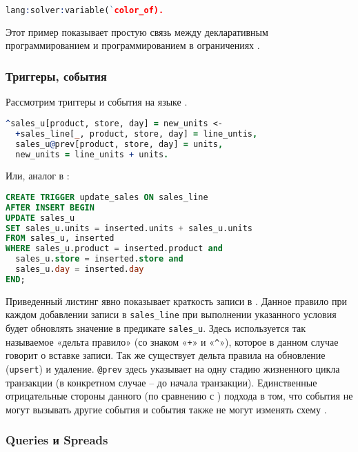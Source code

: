 \begin{lstlisting}[language=Prolog]
lang:solver:variable(`color_of).
\end{lstlisting}

Этот пример показывает простую связь между декларативным программированием и программированием в ограничениях \cite{logiql_vs_datalog}.

\subsubsection{Триггеры, события}
\label{sec:technology:logiql:triggers_events}

Рассмотрим триггеры и события на языке \logiql.

\begin{lstlisting}[language=Prolog]
^sales_u[product, store, day] = new_units <-
  +sales_line[_, product, store, day] = line_untis,
  sales_u@prev[product, store, day] = units,
  new_units = line_units + units.
\end{lstlisting}

Или, аналог в \sql:

\begin{lstlisting}[language=SQL]
CREATE TRIGGER update_sales ON sales_line
AFTER INSERT BEGIN
UPDATE sales_u
SET sales_u.units = inserted.units + sales_u.units
FROM sales_u, inserted
WHERE sales_u.product = inserted.product and
  sales_u.store = inserted.store and
  sales_u.day = inserted.day
END;
\end{lstlisting}

Приведенный листинг явно показывает краткость записи в \logiql. Данное правило при каждом добавлении записи в \lstinline{sales_line} при выполнении указанного условия будет обновлять значение в предикате \lstinline{sales_u}. Здесь используется так называемое «дельта правило» (со знаком «\lstinline{+}» и «\lstinline{^}»), которое в данном случае говорит о вставке записи. Так же существует дельта правила на обновление (\lstinline{upsert}) и удаление. \lstinline{@prev} здесь указывает на одну стадию жизненного цикла транзакции (в конкретном случае – до начала транзакции).
Единственные отрицательные стороны данного (по сравнению с \sql) подхода в том, что события не могут вызывать другие события и события также не могут изменять схему \cite{query_language_for_smart_db}.

\subsubsection{Queries и Spreads}
\label{sec:technology:logiql:queries_spreads}


